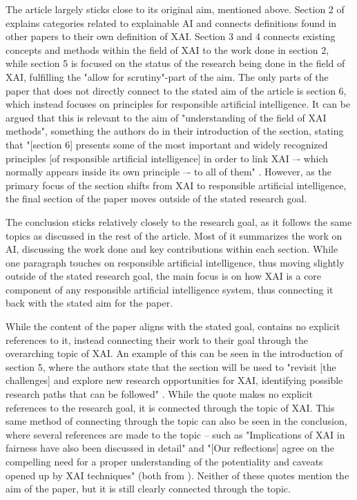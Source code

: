 The article largely sticks close to its original aim, mentioned above. Section 2 of \textcite{Barredo_2020} explains categories related to explainable AI and connects definitions found in other papers to their own definition of XAI. Section 3  and 4 connects existing concepts and methods within the field of XAI to the work done in section 2, while section 5 is focused on the status of the research being done in the field of XAI, fulfilling the "allow for scrutiny"-part of the aim. The only parts of the paper that does not directly connect to the stated aim of the article is section 6, which instead focuses on principles for responsible artificial intelligence. It can be argued that this is relevant to the aim of "understanding of the field of XAI methods", something the authors do in their introduction of the section, stating that "[section 6] presents some of the most important and widely recognized principles [of responsible artificial intelligence] in order to link XAI –- which normally appears inside its own principle –- to all of them" \parencite[p.103]{Barredo_2020}. However, as the primary focus of the section shifts from XAI to responsible artificial intelligence, the final section of the paper moves outside of the stated research goal.

The conclusion sticks relatively closely to the research goal, as it follows the same topics as discussed in the rest of the article. Most of it summarizes the work on AI, discussing the work done and key contributions within each section. While one paragraph touches on responsible artificial intelligence, thus moving slightly outside of the stated research goal, the main focus is on how XAI is a core component of any responsible artificial intelligence system, thus connecting it back with the stated aim for the paper.

While the content of the paper aligns with the stated goal, \textcite{Barredo_2020} contains no explicit references to it, instead connecting their work to their goal through the overarching topic of XAI. An example of this can be seen in the introduction of section 5, where the authors state that the section will be used to "revisit [the challenges] and explore new research opportunities for XAI, identifying possible research paths that can be followed" \parencite[p.99]{Barredo_2020}. While the quote makes no explicit references to the research goal, it is connected through the topic of XAI. This same method of connecting through the topic can also be seen in the conclusion, where several references are made to the topic -- such as "Implications of XAI in fairness have also been discussed in detail" and "[Our reflections] agree on the compelling need for a proper understanding of the potentiality and caveats opened up by XAI techniques" (both from \cite[p.108]{Barredo_2020}). Neither of these quotes mention the aim of the paper, but it is still clearly connected through the topic.

